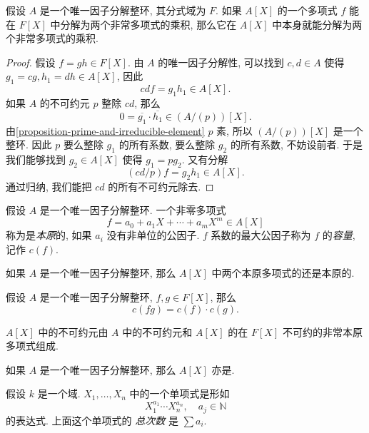 \begin{proposition}
  假设 \( A \) 是一个唯一因子分解整环, 其分式域为 \( F \). 如果 \( A[X] \)
  的一个多项式 \( f \) 能在 \( F[X] \) 中分解为两个非常多项式的乘积,
  那么它在 \( A[X] \) 中本身就能分解为两个非常多项式的乘积.
\end{proposition}
\begin{proof}
  假设 \( f = gh \in F[X] \).
  由 \( A \) 的唯一因子分解性, 可以找到 \( c, d \in A  \) 使得 \( g_1 = cg, h_1
  = dh \in A[X] \), 因此
  \[
    cd f = g_1 h_1 \in A[X].
  \]
  如果 \( A \) 的不可约元 \( p \) 整除 \( cd \), 那么
  \[
    0 = \overline{g_1} \cdot \overline{h_1} \in (A / (p))[X].
  \]
  由\cref{proposition-prime-and-irreducible-element} \( p \) 素, 所以 \( (A /
  (p))[X] \) 是一个整环. 因此 \( p \) 要么整除 \( g_1 \) 的所有系数, 要么整除 \(
  g_2 \) 的所有系数, 不妨设前者. 于是我们能够找到 \( g_2 \in A[X] \) 使得 \( g_1
  = pg_2 \). 又有分解
  \[
    (cd / p)f = g_2 h_1 \in A[X].
  \]
  通过归纳, 我们能把 \( cd \) 的所有不可约元除去.
\end{proof}

假设 \( A \) 是一个唯一因子分解整环. 一个非零多项式
\[
  f = a_0 + a_1 X + \cdots + a_m X^m \in A[X]
\]
称为是\emph{本原}的, 如果 \( a_i \) 没有非单位的公因子.
\( f \) 系数的最大公因子称为 \( f \) 的\emph{容量}, 记作 \( c(f) \).

\begin{proposition}
  如果 \( A \) 是一个唯一因子分解整环, 那么 \( A[X] \)
  中两个本原多项式的还是本原的.
\end{proposition}

\begin{proposition}
  假设 \( A \) 是一个唯一因子分解整环, \( f, g \in F[X] \), 那么
  \[
    c(fg) = c(f) \cdot c(g).
  \]
\end{proposition}

\begin{corollary}
  \( A[X] \) 中的不可约元由  \( A \) 中的不可约元和 \( A[X] \)
  的在 \( F[X] \) 不可约的非常本原多项式组成.
\end{corollary}

\begin{theorem}
  如果 \( A \) 是一个唯一因子分解整环, 那么 \( A[X] \) 亦是.
\end{theorem}

假设 \( k \) 是一个域. \( X_1, \ldots, X_n \) 中的一个单项式是形如
\[
  X_1^{a_1} \cdots X_n^{a_n},\quad a_j \in \mathbb{N}
\]
的表达式. 上面这个单项式的 \emph{总次数} 是 \( \sum a_i \).

